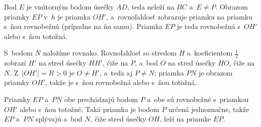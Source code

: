{    Bod $E$ je vnútorným bodom úsečky $AD$, teda neleží na $BC$ a~$E \neq P$. Obrazom priamky $EP$ v~$h$ je priamka $OH'$, a~rovnoľahlosť zobrazuje priamku na priamku s~ňou rovnobežnú (prípadne na ňu samu). Priamka $EP$ je teda rovnobežná s~$OH'$ alebo s~ňou totožná.

    S~bodom $N$ naložíme rovnako. Rovnoľahlosť so stredom $H$ a~koeficientom $\frac12$ zobrazí $H'$ na stred úsečky $HH'$, čiže na $P$, a~bod $O$ na stred úsečky $HO$, čiže na $N$. Z~$|OH'| = R > 0$ je $O \neq H'$, a~teda aj $P \neq N$; priamka $PN$ je obrazom priamky $OH'$, takže je s~ňou rovnobežná alebo s~ňou totožná.

    Priamky $EP$ a~$PN$ obe prechádzajú bodom $P$ a~obe sú rovnobežné s~priamkou $OH'$ alebo s~ňou totožné. Taká priamka je bodom $P$ určená jednoznačne, takže $EP$ a~$PN$ splývajú a~bod $N$, čiže stred úsečky $OH$, leží na priamke $EP$.
}

